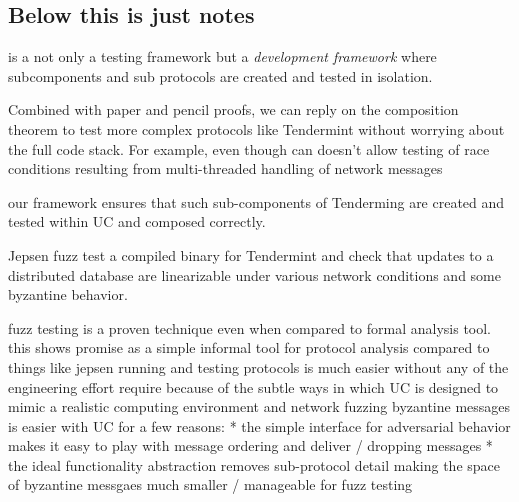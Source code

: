 
\subsection{Below this is just notes}

\us is a not only a testing framework but a \emph{development framework} where subcomponents and sub protocols are created and tested in isolation.

Combined with paper and pencil proofs, we can reply on the composition theorem to test more complex protocols like Tendermint without worrying about the full code stack.
For example, even though \us can doesn't allow testing of race conditions resulting from multi-threaded handling of network messages 

our framework ensures that such sub-components of Tenderming are created and tested
within UC and composed correctly. 

Jepsen fuzz test a compiled binary for Tendermint and check that updates to a distributed database are linearizable under various network conditions and some byzantine behavior.



fuzz testing is a proven technique even when compared to formal analysis tool. this shows promise as a simple informal tool for protocol analysis
compared to things like jepsen running and testing protocols is much easier without any of the engineering effort require because of the subtle ways in which UC is designed to mimic a realistic computing environment and network
fuzzing byzantine messages is easier with UC for a few reasons:
* the simple interface for adversarial behavior makes it easy to play with message ordering and deliver / dropping messages
* the ideal functionality abstraction removes sub-protocol detail making the space of byzantine messgaes much smaller / manageable for fuzz testing


